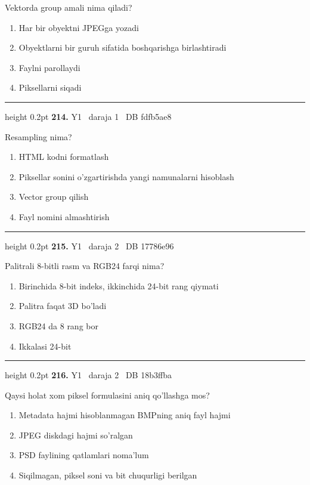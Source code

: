 \documentclass[10pt,a4paper,oneside]{article}
\begin{document}
Vektorda group amali nima qiladi?
\begin{enumerate}[label=\Alph*),leftmargin=9mm]
\item Har bir obyektni JPEGga yozadi
\item Obyektlarni bir guruh sifatida boshqarishga birlashtiradi
\item Faylni parollaydi
\item Piksellarni siqadi
\end{enumerate}
\vspace{2mm}\hrule height 0.2pt \vspace{4mm}
\hypertarget{q214}{\textbf{\color{ink}214.}}  {\color{muted}\scriptsize Y1 \textbullet\ daraja 1 \textbullet\ DB fdfb5ae8}
\par
Resampling nima?
\begin{enumerate}[label=\Alph*),leftmargin=9mm]
\item HTML kodni formatlash
\item Piksellar sonini o'zgartirishda yangi namunalarni hisoblash
\item Vector group qilish
\item Fayl nomini almashtirish
\end{enumerate}
\vspace{2mm}\hrule height 0.2pt \vspace{4mm}
\hypertarget{q215}{\textbf{\color{ink}215.}}  {\color{muted}\scriptsize Y1 \textbullet\ daraja 2 \textbullet\ DB 17786e96}
\par
Palitrali 8-bitli rasm va RGB24 farqi nima?
\begin{enumerate}[label=\Alph*),leftmargin=9mm]
\item Birinchida 8-bit indeks, ikkinchida 24-bit rang qiymati
\item Palitra faqat 3D bo'ladi
\item RGB24 da 8 rang bor
\item Ikkalasi 24-bit
\end{enumerate}
\vspace{2mm}\hrule height 0.2pt \vspace{4mm}
\hypertarget{q216}{\textbf{\color{ink}216.}}  {\color{muted}\scriptsize Y1 \textbullet\ daraja 2 \textbullet\ DB 18b3ffba}
\par
Qaysi holat xom piksel formulasini aniq qo'llashga mos?
\begin{enumerate}[label=\Alph*),leftmargin=9mm]
\item Metadata hajmi hisoblanmagan BMPning aniq fayl hajmi
\item JPEG diskdagi hajmi so'ralgan
\item PSD faylining qatlamlari noma'lum
\item Siqilmagan, piksel soni va bit chuqurligi berilgan
\end{enumerate}
\end{document}
